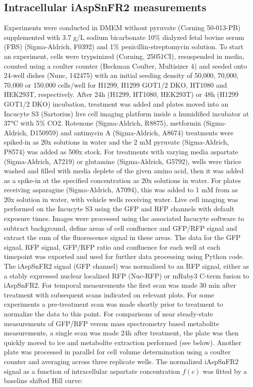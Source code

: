 \documentclass[9pt,lineno]{elife}
\begin{document}
\subsection{Intracellular iAspSnFR2 measurements}
Experiments were conducted in DMEM without pyruvate (Corning 50-013-PB) supplemented with 3.7 g/L sodium bicarbonate 10\% dialyzed fetal bovine serum (FBS) (Sigma-Aldrich, F0392) and 1\% penicillin-streptomycin solution.
To start an experiment, cells were trypsinized (Corning, 25051CI), resuspended in media, counted using a coulter counter (Beckman Coulter, Multisizer 4) and seeded onto 24-well dishes (Nunc, 142475) with an initial seeding density of 50,000, 70,000, 70,000 or 150,000 cells/well for H1299, H1299 GOT1/2 DKO, HT1080 and HEK293T, respectively.
After 24h (H1299, HT1080, HEK293T) or 48h (H1299 GOT1/2 DKO) incubation, treatment was added and plates moved into an Incucyte S3 (Sartorius) live cell imaging platform inside a humidified incubator at 37°C with 5\% CO2.
Rotenone (Sigma-Aldrich, R8875), metformin (Sigma-Aldrich, D150959) and antimycin A (Sigma-Aldrich, A8674) treatments were spiked-in as 20x solutions in water and the 2 mM pyruvate (Sigma-Aldrich, P8574) was added as 500x stock.
For treatments with varying media aspartate (Sigma-Aldrich, A7219) or glutamine (Sigma-Aldrich, G5792), wells were thrice washed and filled with media deplete of the given amino acid, then it was added as a spike-in at the specified concentration as 20x solutions in water.
For plates receiving asparagine (Sigma-Aldrich, A7094), this was added to 1 mM from as 20x solution in water, with vehicle wells receiving water.
Live cell imaging was performed on the Incucyte S3 using the GFP and RFP channels with default exposure times.
Images were processed using the associated Incucyte software to subtract background, define areas of cell confluence and GFP/RFP signal and extract the sum of the fluorescence signal in these areas.
The data for the GFP signal, RFP signal, GFP/RFP ratio and confluence for each well at each timepoint was exported and used for further data processing using Python code.
The iAspSnFR2 signal (GFP channel) was normalized to an RFP signal, either as a stably expressed nuclear localized RFP (Nuc-RFP) or mRuby3 C-term fusion to iAspSnFR2.
For temporal measurements the first scan was made 30 min after treatment with subsequent scans indicated on relevant plots.
For some experiments a pre-treatment scan was made shortly prior to treatment to normalize the data to this point.
For comparisons of near steady-state measurements of GFP/RFP versus mass spectrometry based metabolite measurements, a single scan was made 24h after treatment, the plate was then quickly moved to ice and metabolite extraction performed (see below).
Another plate was processed in parallel for cell volume determination using a coulter counter and averaging across three replicate wells.
The normalized iAspSnFR2 signal as a function of intracellular aspartate concentration $f(c)$ was fitted by a baseline shifted Hill curve:
\end{document}
